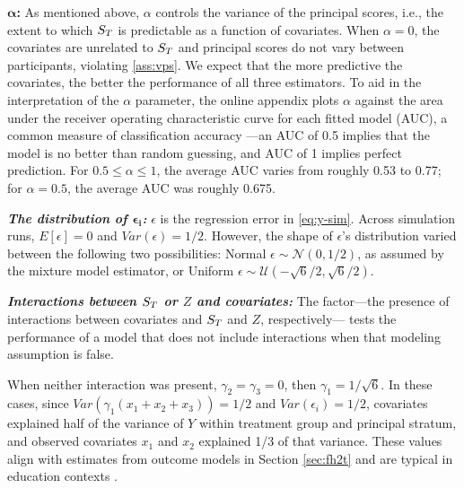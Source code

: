 \documentclass[]{article}
\begin{document}
$\bm{\alpha}$\textbf{:} As mentioned above, $\alpha$ controls the variance of the principal scores, i.e., the extent to which $S_T$ is predictable as a function of covariates. When $\alpha=0$, the covariates are unrelated to $S_T$ and principal scores do not vary between participants, violating \eqref{ass:vps}. We expect that the more predictive the covariates, the better the performance of all three estimators.
To aid in the interpretation of the $\alpha$ parameter, the online appendix plots $\alpha$ against the area under the receiver operating characteristic curve for each fitted model (AUC), a common measure of classification accuracy \citep{bradley1997use}---an AUC of 0.5 implies that the model is no better than random guessing, and AUC of 1 implies perfect prediction. For $0.5\le \alpha \le 1$, the average AUC varies from roughly 0.53 to 0.77; for $\alpha=0.5$, the average AUC was roughly 0.675.


\textbf{\emph{The distribution of $\bm{\epsilon_i}$:}} $\epsilon$ is the regression error in \eqref{eq:y-sim}. Across simulation runs, $E[\epsilon]=0$ and $Var(\epsilon)=1/2$. However, the shape of $\epsilon$'s distribution varied between the following two possibilities:
Normal $\epsilon\sim\mathcal{N}(0,1/2)$, as assumed by the mixture model estimator, or Uniform $\epsilon\sim\mathcal{U}(-\sqrt{6}/2,\sqrt{6}/2)$.



\textbf{\emph{Interactions between $S_T$ or $Z$ and covariates:}} The factor---the presence of interactions between covariates and $S_T$ and $Z$, respectively--- tests the performance of a model that does not include interactions when that modeling assumption is false.

When neither interaction was present, $\gamma_2=\gamma_3=0$, then $\gamma_1=1/\sqrt{6}$.
In these cases, since  $Var(\gamma_1(x_1+x_2+x_3))=1/2$ and $Var(\epsilon_i)=1/2$, covariates explained half of the variance of $Y$ within treatment group and principal stratum, and observed covariates $x_1$ and $x_2$ explained 1/3 of that variance.
These values align with estimates from outcome models in Section \ref{sec:fh2t} and are typical in education contexts \cite{hedgesHedberg}.
\end{document}
